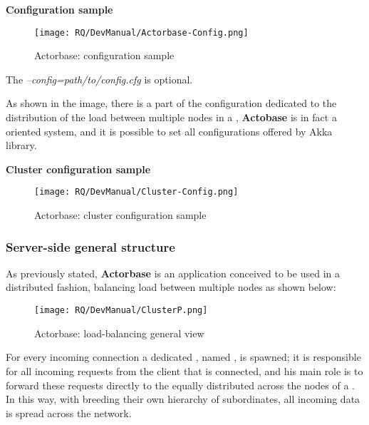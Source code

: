 \documentclass{scalatekids-article}
\begin{document}
\newpage
\textbf{Configuration sample}

\begin{figure}[H]
  \begin{center}
    \texttt{[image: RQ/DevManual/Actorbase-Config.png]}
    \caption{Actorbase: configuration sample}
  \end{center}
\end{figure}

The \textit{--config=path/to/config.cfg} is optional.

As shown in the image, there is a part of the configuration dedicated to the
distribution of the load between multiple nodes in a , \textbf{Actobase} is in fact a
 oriented system, and it is possible to set all
 configurations offered by Akka library.

\newpage
\textbf{Cluster configuration sample}

\begin{figure}[H]
  \begin{center}
    \texttt{[image: RQ/DevManual/Cluster-Config.png]}
    \caption{Actorbase: cluster configuration sample}
  \end{center}
\end{figure}

\newpage
\subsubsection{Server-side general structure}

As previously stated, \textbf{Actorbase} is an application conceived to be used in a distributed fashion,
balancing load between multiple nodes as shown below:

\begin{figure}[H]
  \begin{center}
    \texttt{[image: RQ/DevManual/ClusterP.png]}
    \caption{Actorbase: load-balancing general view}
  \end{center}
\end{figure}

For every incoming connection a dedicated , named ,
is spawned; it is responsible for all incoming requests from the
client that is connected, and his main role is to forward these requests directly to the
  equally distributed across the nodes of a
. In this way, with   breeding
their own hierarchy of subordinates, all incoming data is spread across the
 network.
\end{document}
